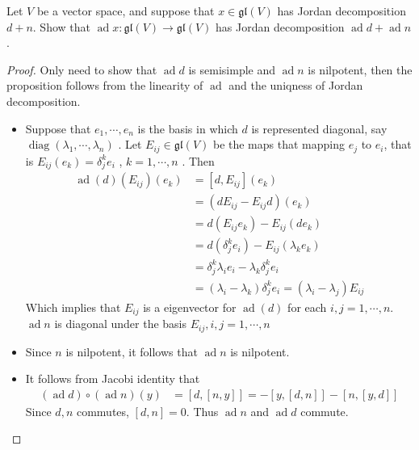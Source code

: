 \documentclass[../main.tex]{subfiles}
\begin{document}
\begin{exercise}{}{}
    Let $V$ be a vector space, and suppose that $x \in \mathfrak{gl}(V)$ has Jordan decomposition $d+n$. Show that $\operatorname{ad} x : \mathfrak{gl}(V) \to \mathfrak{gl}(V)$ has Jordan decomposition $\operatorname{ad} d + \operatorname{ad} n$.
\end{exercise}
\begin{proof}
    Only need to show that \(  \operatorname{ad}d  \) is semisimple and \(  \operatorname{ad}n  \) is nilpotent, then the proposition follows from the linearity of \(  \operatorname{ad}  \) and the uniqness of Jordan decomposition. 

    \begin{itemize}
        \item Suppose that \(   e_1,\cdots,e_n   \) is the basis in which \(  d  \) is represented diagonal, say \(  \operatorname{diag} \left(  \lambda _1 ,\cdots , \lambda _{n} \right)    \) .  Let \(  E_{ij} \in \mathfrak{gl}\left( V \right)   \) be the maps that  mapping \(  e_{j}  \) to \(  e_{i}  \), that is \(  E_{ij}\left( e_{k} \right)=  \delta _{j}^{k}e_{i}   \) , \(  k=  1,\cdots,n   \) . Then \[
      \begin{aligned}
        \operatorname{ad}\left( d \right)\left( E_{ij} \right)\left( e_{k} \right)&= \left[ d,E_{ij} \right]\left( e_{k} \right)    \\ 
         &= \left( dE_{ij}-E_{ij}d \right)\left( e_{k} \right)\\ 
          &=   d\left( E_{ij}e_{k} \right)- E_{ij}\left( de_{k} \right)\\ 
           &= d\left(  \delta _{j}^{k}e_{i} \right)- E_{ij}\left(  \lambda _{k}e_{k} \right)\\ 
            &=  \delta _{j}^{k} \lambda _{i}e_{i}-  \lambda _{k} \delta _{j}^{k}e_{i}\\ 
             &= \left(  \lambda _{i}- \lambda _{k} \right) \delta _{j}^{k}e_{i}= \left(  \lambda _{i}- \lambda _{j} \right)E_{ij} 
      \end{aligned}  
        \] Which implies that \(  E_{ij}  \) is a eigenvector for \(  \operatorname{ad}\left( d \right)   \) for each \(  i,j=  1,\cdots,n   \). \(  \operatorname{ad}n  \) is diagonal under the basis \(  E_{ij}, i,j=  1,\cdots,n   \)     
        \item Since \(  n  \) is nilpotent, it follows that \(  \operatorname{ad}n  \) is nilpotent. 
        \item  It follows from Jacobi identity that \[
       \begin{aligned}
        \left( \operatorname{ad}d \right)\circ \left( \operatorname{ad}n \right)\left( y \right)&= \left[ d, \left[ n,y \right]  \right]= -\left[ y,\left[ d,n \right]  \right]-\left[ n,\left[ y,d \right]  \right]  
       \end{aligned}     
        \]Since \(  d,n  \) commutes,  \(  \left[ d,n \right]= 0   \).  Thus \(  \operatorname{ad}n  \) and \(  \operatorname{ad}d  \) commute.  
    \end{itemize}
    
\end{proof}
\end{document}
